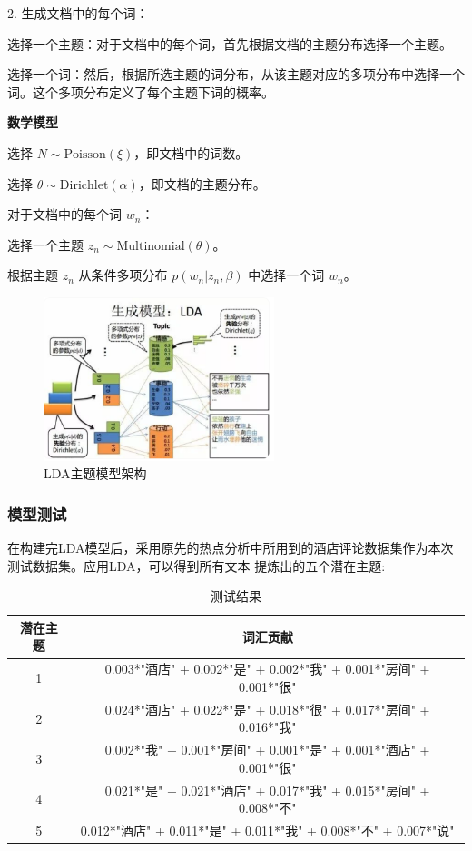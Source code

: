 \documentclass[UTF8,a4paper,15pt,titlepage,oneside]{ctexbook}
\begin{document}
2. 生成文档中的每个词：

选择一个主题：对于文档中的每个词，首先根据文档的主题分布选择一个主题。

选择一个词：然后，根据所选主题的词分布，从该主题对应的多项分布中选择一个词。这个多项分布定义了每个主题下词的概率。

\vskip 0.2cm
\noindent
\textbf{数学模型}

选择 $N \sim \text{Poisson}(\xi)$，即文档中的词数。

选择 $\theta \sim \text{Dirichlet}(\alpha)$，即文档的主题分布。

对于文档中的每个词 $w_n$：
    
        \;\;\;\;\;\;\;\;选择一个主题 $z_n \sim \text{Multinomial}(\theta)$。

        \;\;\;\;\;\;\;\;根据主题 $z_n$ 从条件多项分布 $p(w_n | z_n, \beta)$ 中选择一个词 $w_n$。

\begin{figure}[H]
  \centering
  \includegraphics[width=0.6\textwidth,keepaspectratio=false]{pictures/36.png} %
  \caption{LDA主题模型架构}
  
\end{figure}

\subsubsection{模型测试}

在构建完LDA模型后，采用原先的热点分析中所用到的酒店评论数据集作为本次测试数据集。应用LDA，可以得到所有文本
提炼出的五个潜在主题:

\begin{table}[H]
  \centering
  \begin{tabular}{cc}
  \toprule
  潜在主题&词汇贡献\\
  \midrule
  1 & 0.003*"酒店" + 0.002*"是" + 0.002*"我" + 0.001*"房间" + 0.001*"很" \\
  2 & 0.024*"酒店" + 0.022*"是" + 0.018*"很" + 0.017*"房间" + 0.016*"我"\\
  3 &0.002*"我" + 0.001*"房间" + 0.001*"是" + 0.001*"酒店" + 0.001*"很"\\
  4 &0.021*"是" + 0.021*"酒店" + 0.017*"我" + 0.015*"房间" + 0.008*"不"\\
  5 &0.012*"酒店" + 0.011*"是" + 0.011*"我" + 0.008*"不" + 0.007*"说"\\
  \bottomrule
  \end{tabular}
  \caption{测试结果}
  \end{table}
\end{document}
